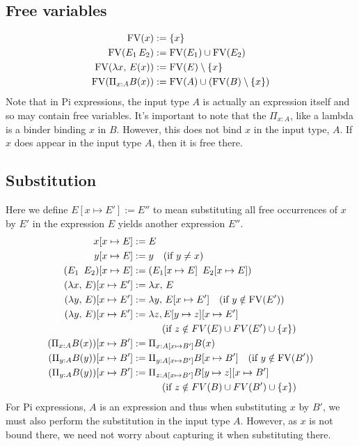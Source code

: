 \documentclass{article}
\begin{document}
\subsection{Free variables}
\begin{align*}
  \operatorname{FV} (x) &:= \{x\} \\
  \operatorname{FV} (E_1 \, E_2) &:= \operatorname{FV}(E_1) \cup \operatorname{FV}(E_2) \\
  \operatorname{FV} (\lambda x, \, E(x)) &:= \operatorname{FV}(E) \setminus \{x\} \\
  \operatorname{FV} (\Pi_{x : A} B(x)) &:= \operatorname{FV}(A) \cup (\operatorname{FV}(B) \setminus \{x\})
\end{align*}
Note that in Pi expressions, the input type $A$ is actually an expression itself
and so may contain free variables. It's important to note that the $\Pi_{x :
  A}$, like a lambda is a binder binding $x$ in $B$. However, this does not bind
$x$ in the input type, $A$. If $x$ does appear in the input type $A$, then it is
free there.

\subsection{Substitution}
Here we define $E [x \mapsto E'] := E''$ to mean substituting all free
occurrences of $x$ by $E'$ in the expression $E$ yields another expression $E''$.
\begin{align*}
  x[x \mapsto E] &:= E \\
  y[x \mapsto E] &:= y \quad (\text{if } y \ne x) \\
  (E_1 \,\,\, E_2) [x \mapsto E] &:= (E_1 [x \mapsto E] \,\,\, E_2 [x \mapsto E]) \\
  (\lambda x, \, E) [x \mapsto E'] &:= \lambda x, \, E \\ 
  (\lambda y, \, E) [x \mapsto E'] &:= \lambda y, \, E[x \mapsto E'] \quad (\text{if } y \notin \operatorname{FV}(E')) \\ 
  (\lambda y, \, E) [x \mapsto E'] &:= \lambda z, E[y \mapsto z][x \mapsto E'] \\
                 &\quad \quad \quad (\text{if } z \notin FV(E) \cup FV(E') \cup \{x\}) \\
  (\Pi_{x : A} B(x)) [x \mapsto B'] &:= \Pi_{x : A[x \mapsto B']} B(x) \\ 
  (\Pi_{y : A} B(y)) [x \mapsto B'] &:= \Pi_{y : A[x \mapsto B']} B[x \mapsto B'] \quad (\text{if } y \notin \operatorname{FV}(B')) \\ 
  (\Pi_{y : A} B(y)) [x \mapsto B'] &:= \Pi_{z : A[x \mapsto B']} B[y \mapsto z][x \mapsto B'] \\
                 &\quad \quad \quad (\text{if } z \notin FV(B) \cup FV(B') \cup \{x\})
\end{align*}
For Pi expressions, $A$ is an expression and thus when substituting $x$ by
$B'$, we must also perform the substitution in the input type $A$. However, as
$x$ is not bound there, we need not worry about capturing it when substituting there. 
\end{document}
